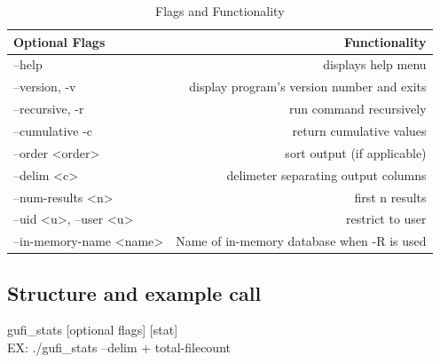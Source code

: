 \documentclass{article}
\begin{document}
\begin{table} [h]
\centering
\begin{tabular}{l|r}
Optional Flags & Functionality\\\hline
--help & displays help menu\\ 
--version, -v & display program's version number and exits \\
--recursive, -r & run command recursively \\
--cumulative -c & return cumulative values \\
--order \textless order\textgreater & sort output (if applicable)\\
--delim \textless c\textgreater & delimeter separating output columns\\
--num-results \textless n\textgreater & first n results \\
--uid \textless u\textgreater, --user \textless u\textgreater & restrict to user \\
--in-memory-name \textless name\textgreater & Name of in-memory database when -R is used
\end{tabular}
\caption{\label{tab:widgets}Flags and Functionality}
\end{table}

\subsection{Structure and example call}
gufi\_stats [optional flags] [stat] \\
EX: ./gufi\_stats --delim + total-filecount
\end{document}
